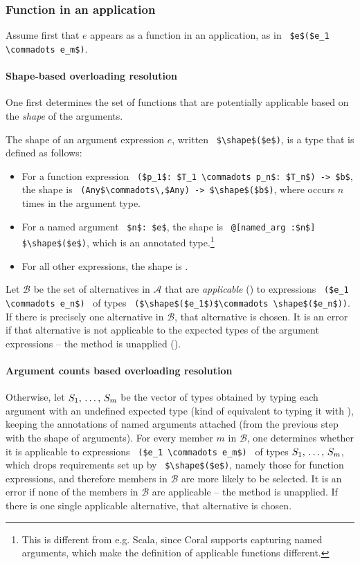 \subsubsection{Function in an application}

Assume first that $e$ appears as a function in an application, as in ~\lstinline!$e$($e_1 \commadots e_m$)!.

\paragraph{Shape-based overloading resolution}
One first determines the set of functions that are potentially applicable based on the {\em shape} of the arguments. 

The shape of an argument expression $e$, written ~\lstinline!$\shape$($e$)!, is a type that is defined as follows:
\begin{itemize}
\item For a function expression ~\lstinline!($p_1$: $T_1 \commadots p_n$: $T_n$) -> $b$!, the shape is ~\lstinline!(Any$\commadots\,$Any) -> $\shape$($b$)!, where  occurs $n$ times in the argument type. 
\item For a named argument ~\lstinline!$n$: $e$!, the shape is ~\lstinline!@[named_arg :$n$] $\shape$($e$)!, which is an annotated type.\footnote{This is different from e.g. Scala, since Coral supports capturing named arguments, which make the definition of applicable functions different.} %
\item For all other expressions, the shape is . 
\end{itemize}

Let $\mathcal{B}$ be the set of alternatives in $\mathcal{A}$ that are {\em applicable} () to expressions ~\lstinline!($e_1 \commadots e_n$)!~ of types ~\lstinline!($\shape$($e_1$)$\commadots \shape$($e_n$))!. If there is precisely one alternative in $\mathcal{B}$, that alternative is chosen. It is an error if that alternative is not applicable to the expected types of the argument expressions -- the method is unapplied (). 

\paragraph{Argument counts based overloading resolution}
Otherwise, let $S_1 ,\, \ldots ,\, S_m$ be the vector of types obtained by typing each argument with an undefined expected type (kind of equivalent to typing it with ), keeping the annotations of named arguments attached (from the previous step with the shape of arguments). For every member $m$ in $\mathcal{B}$, one determines whether it is applicable to expressions ~\lstinline!($e_1 \commadots e_m$)!~ of types $S_1 ,\, \ldots ,\, S_m$, which drops requirements set up by ~\lstinline!$\shape$($e$)!, namely those for function expressions, and therefore members in $\mathcal{B}$ are more likely to be selected. It is an error if none of the members in $\mathcal{B}$ are applicable -- the method is unapplied. If there is one single applicable alternative, that alternative is chosen. 

